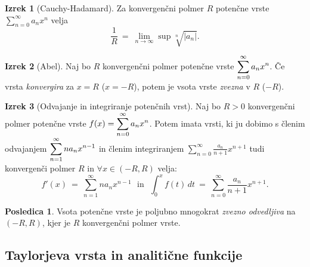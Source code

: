 \documentclass[11pt]{article}
\theoremstyle{definition}
\theoremstyle{definition}
\theoremstyle{definition}
\newtheorem{izrek}{Izrek}[section]
\theoremstyle{theorem}
\newtheorem*{posledica}{Posledica}
\begin{document}
\begin{izrek}[Cauchy-Hadamard]

Za konvergenčni polmer $R$ potenčne vrste $\sum_{n=0}^\infty a_n x^n$ velja
$$\frac{1}{R} ~=~ \lim_{n \rightarrow \infty} \sup{\sqrt[n]{|a_n|}}.$$

\end{izrek}
\vspace{0.5cm}

\begin{izrek}[Abel]

Naj bo $R$ konvergenčni polmer potenčne vrste $\mathlarger{\sum_{n=0}^\infty a_n x^n}$. Če vrsta \textit{konvergira} za $x = R$ ($x = -R$), potem je vsota vrste \textit{zvezna} v $R$ ($-R$).

\end{izrek}
\vspace{0.5cm}

\begin{izrek}[Odvajanje in integriranje potenčnih vrst]

Naj bo $R > 0$ konvergenčni polmer potenčne vrste $\mathlarger{f(x) = \sum_{n=0}^\infty a_n x^n}$. Potem imata vrsti, ki ju dobimo s členim odvajanjem $\mathlarger{\sum_{n=1}^\infty n a_n x^{n-1}}$ in členim integriranjem $\sum_{n=0}^\infty \frac{a_n}{n+1} x^{n+1}$ tudi konvergenči polmer $R$ in $\forall x \in (-R, R)$ velja:
$$f'(x) ~=~ \sum_{n=1}^\infty n a_n x^{n-1} ~~~\text{in}~~~ \int_0^x f(t)\,dt ~=~ \sum_{n=0}^\infty \frac{a_n}{n+1} x^{n+1}.$$

\end{izrek}
\vspace{0.5cm}

\begin{posledica}

Vsota potenčne vrste je poljubno mnogokrat \textit{zvezno odvedljiva} na $(-R, R)$, kjer je $R$ konvergenčni polmer vrste.

\end{posledica}
\vspace{0.5cm}


\subsection{Taylorjeva vrsta in analitične funkcije}
\vspace{0.5cm}
\end{document}

